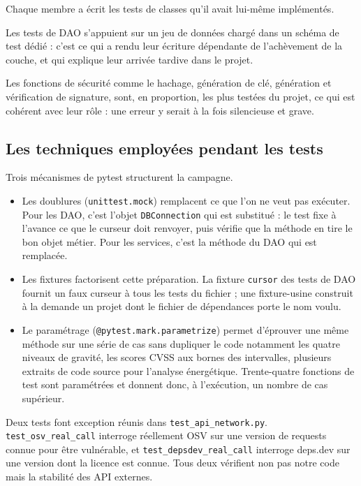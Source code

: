 \documentclass[a4paper,12pt]{article}
\providecommand{\tightlist}{\setlength{\itemsep}{0pt}\setlength{\parskip}{0pt}}
\providecommand{\tightlist}{}
\begin{document}
Chaque membre a écrit les tests de classes qu'il avait lui-même
implémentés.

Les tests de DAO s'appuient sur un jeu de données chargé dans un schéma
de test dédié : c'est ce qui a rendu leur écriture dépendante de
l'achèvement de la couche, et qui explique leur arrivée tardive dans le
projet.

Les fonctions de sécurité comme le hachage, génération de clé,
génération et vérification de signature, sont, en proportion, les plus
testées du projet, ce qui est cohérent avec leur rôle : une erreur y
serait à la fois silencieuse et grave.

\subsection{Les techniques employées pendant les
tests}\label{les-techniques-employuxe9es-pendant-les-tests}

Trois mécanismes de pytest structurent la campagne.

\begin{itemize}
\tightlist
\item
  Les doublures (\texttt{unittest.\allowbreak{}mock}) remplacent ce que
  l'on ne veut pas exécuter. Pour les DAO, c'est l'objet
  \texttt{DBConnection} qui est substitué : le test fixe à l'avance ce
  que le curseur doit renvoyer, puis vérifie que la méthode en tire le
  bon objet métier. Pour les services, c'est la méthode du DAO qui est
  remplacée.
\item
  Les fixtures factorisent cette préparation. La fixture \texttt{cursor}
  des tests de DAO fournit un faux curseur à tous les tests du fichier ;
  une fixture-usine construit à la demande un projet dont le fichier de
  dépendances porte le nom voulu.
\item
  Le paramétrage
  (\texttt{@\allowbreak{}pytest.\allowbreak{}mark.\allowbreak{}parametrize})
  permet d'éprouver une même méthode sur une série de cas sans dupliquer
  le code notamment les quatre niveaux de gravité, les scores CVSS aux
  bornes des intervalles, plusieurs extraits de code source pour
  l'analyse énergétique. Trente-quatre fonctions de test sont
  paramétrées et donnent donc, à l'exécution, un nombre de cas
  supérieur.
\end{itemize}

Deux tests font exception réunis dans
\texttt{test\_\allowbreak{}api\_\allowbreak{}network.\allowbreak{}py}.
\texttt{test\_\allowbreak{}osv\_\allowbreak{}real\_\allowbreak{}call}
interroge réellement OSV sur une version de requests connue pour être
vulnérable, et
\texttt{test\_\allowbreak{}depsdev\_\allowbreak{}real\_\allowbreak{}call}
interroge deps.dev sur une version dont la licence est connue. Tous deux
vérifient non pas notre code mais la stabilité des API externes.
\end{document}
